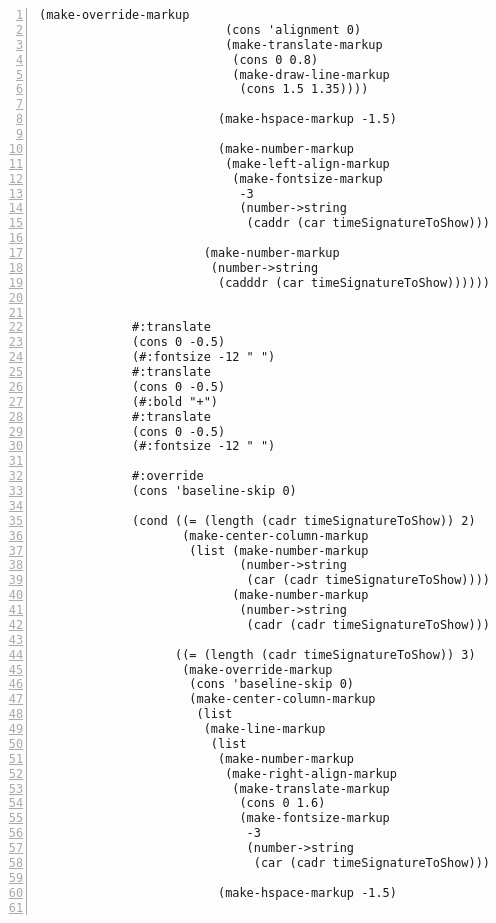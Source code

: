 \begin{Verbatim}[numbers=left,xleftmargin=5mm]
                         (make-override-markup
                          (cons 'alignment 0)
                          (make-translate-markup
                           (cons 0 0.8)
                           (make-draw-line-markup
                            (cons 1.5 1.35))))

                         (make-hspace-markup -1.5)

                         (make-number-markup
                          (make-left-align-markup
                           (make-fontsize-markup
                            -3
                            (number->string
                             (caddr (car timeSignatureToShow))))))))

                       (make-number-markup
                        (number->string
                         (cadddr (car timeSignatureToShow)))))))))


             #:translate
             (cons 0 -0.5)
             (#:fontsize -12 " ")
             #:translate
             (cons 0 -0.5)
             (#:bold "+")
             #:translate
             (cons 0 -0.5)
             (#:fontsize -12 " ")

             #:override
             (cons 'baseline-skip 0)

             (cond ((= (length (cadr timeSignatureToShow)) 2)
                    (make-center-column-markup
                     (list (make-number-markup
                            (number->string
                             (car (cadr timeSignatureToShow))))
                           (make-number-markup
                            (number->string
                             (cadr (cadr timeSignatureToShow)))))))

                   ((= (length (cadr timeSignatureToShow)) 3)
                    (make-override-markup
                     (cons 'baseline-skip 0)
                     (make-center-column-markup
                      (list
                       (make-line-markup
                        (list
                         (make-number-markup
                          (make-right-align-markup
                           (make-translate-markup
                            (cons 0 1.6)
                            (make-fontsize-markup
                             -3
                             (number->string
                              (car (cadr timeSignatureToShow)))))))

                         (make-hspace-markup -1.5)


\end{Verbatim}
